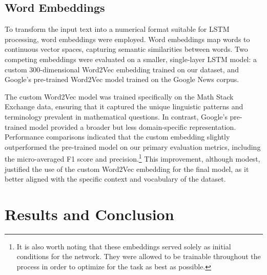 \documentclass[12pt, letterpaper]{article}
\begin{document}
\subsection{Word Embeddings}
To transform the input text into a numerical format suitable for LSTM processing, word embeddings were employed. Word embeddings map words to continuous vector spaces, capturing semantic similarities between words. Two competing embeddings were evaluated on a smaller, single-layer LSTM model: a custom 300-dimensional Word2Vec embedding trained on our dataset, and Google's pre-trained Word2Vec model trained on the Google News corpus.
\par The custom Word2Vec model was trained specifically on the Math Stack Exchange data, ensuring that it captured the unique linguistic patterns and terminology prevalent in mathematical questions. In contrast, Google's pre-trained model provided a broader but less domain-specific representation. Performance comparisons indicated that the custom embedding slightly outperformed the pre-trained model on our primary evaluation metrics, including the micro-averaged F1 score and precision.\footnote{It is also worth noting that these embeddings served solely as initial conditions for the network. They were allowed to be trainable throughout the process in order to optimize for the task as best as possible.} This improvement, although modest, justified the use of the custom Word2Vec embedding for the final model, as it better aligned with the specific context and vocabulary of the dataset.
\section{Results and Conclusion}
\end{document}
